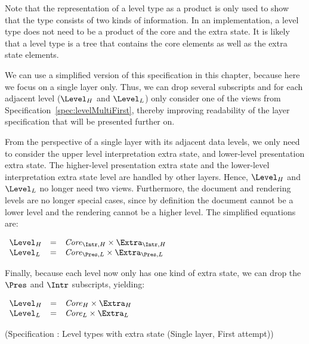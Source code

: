 Note that the representation of a level type as a product is only used to show that the type consists of two kinds of information. In an implementation, a level type does not need to be a product of the core and the extra state. It is likely that a level type is a tree that contains the core elements as well as the extra state elements.

We can use a simplified version of this specification in this chapter, because here we focus on a single layer only. Thus, we can drop several subscripts and for each adjacent level ($\Level_{H}$ and $\Level_{L}$) only consider one of the views from Specification~\ref{spec:levelMultiFirst}, thereby improving readability of the layer specification that will be presented further on. 

From the perspective of a single layer with its adjacent data levels, we only need to consider the upper level interpretation extra state, and lower-level presentation extra state. The higher-level presentation extra state and the lower-level interpretation extra state level are handled by other layers. Hence, $\Level_{H}$ and $\Level_{L}$ no longer need two views. Furthermore, the document and rendering levels are no longer special cases, since by definition the document cannot be a lower level and the rendering cannot be a higher level. The simplified equations are:

\begin{small}\( \begin{array}{lcll}
\Level_{H} & = & \Core_{\Intr, H} \times \Extra_{\Intr, H}\\
\Level_{L} & = & \Core_{\Pres, L} \times \Extra_{\Pres, L}\\
\end{array}\)\end{small}

Finally, because each level now only has one kind of extra state, we can drop the $\Pres$ and $\Intr$ subscripts, yielding:

\begin{small}
 \label{spec:levelSingleFirst}
\( \begin{array}{lcll}
\Level_{H} & = & \Core_{H} \times \Extra_{H}\\
\Level_{L} & = & \Core_{L} \times \Extra_{L}\\
\end{array}\)\end{small}
\begin{center}(Specification \thespecification: Level types with extra state (Single layer, First attempt))\end{center}
\ec



